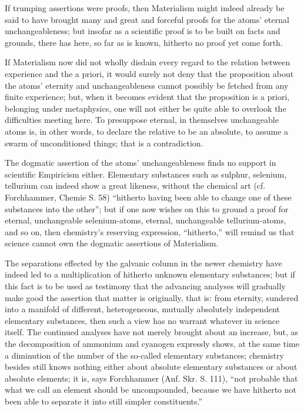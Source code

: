 \documentclass[12pt]{book}
\begin{document}
If trumping assertions were proofs, then Materialism might indeed already be said to have brought many and
great and forceful proofs for the atoms' eternal unchangeableness; but insofar as a scientific proof is to
be built on facts and grounds, there has here, so far as is known, hitherto no proof yet come forth.

If Materialism now did not wholly disdain every regard to the relation between experience and the a priori,
it would surely not deny that the proposition about the atoms' eternity and unchangeableness cannot possibly
be fetched from any finite experience; but, when it becomes evident that the proposition is a priori,
belonging under metaphysics, one will not either be quite able to overlook the difficulties meeting here. To
presuppose eternal, in themselves unchangeable atoms is, in other
words, to declare the relative to be an absolute, to assume a swarm of unconditioned things; that is a
contradiction.

The dogmatic assertion of the atoms' unchangeableness finds no support in scientific Empiricism either.
Elementary substances such as sulphur, selenium, tellurium can indeed show a great likeness, without the
chemical art (cf. Forchhammer, Chemie S. 58) ``hitherto having been able to change one of these substances
into the other''; but if one now wishes on this to ground a proof for eternal, unchangeable selenium-atoms,
eternal, unchangeable tellurium-atoms, and so on, then chemistry's reserving expression, ``hitherto,'' will
remind us that science cannot own the dogmatic assertions of Materialism.

The separations effected by the galvanic column in the newer chemistry have indeed led to a multiplication
of hitherto unknown elementary substances; but if this fact is to be used as testimony that the advancing
analyses will gradually make good the assertion that matter is originally, that is: from eternity, sundered
into a manifold of different, heterogeneous, mutually absolutely independent elementary substances, then
such a view has no warrant whatever in science itself. The continued analyses have not merely brought about
an increase, but, as the decomposition of ammonium and cyanogen expressly shows, at the same time a
diminution of the number of the so-called elementary substances; chemistry
besides still knows nothing either about absolute elementary substances or about absolute elements; it is,
says Forchhammer (Anf. Skr. S. 111), ``not probable that what we call an element should be uncompounded,
because we have hitherto not been able to separate it into still simpler constituents.''
\end{document}
